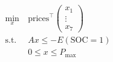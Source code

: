 \documentclass[preview]{standalone}
\begin{document}
\begin{align*}
\begin{aligned}\min_{x} &\ \text{prices}^\top \begin{pmatrix} x_1\\ \vdots\\ x_7 \end{pmatrix} \\\text{s.t.} &\ Ax \leq -E\left(\text{SOC}=1\right) \\&\ 0 \leq x \leq P_\text{max} \end{aligned}
\end{align*}
\end{document}
